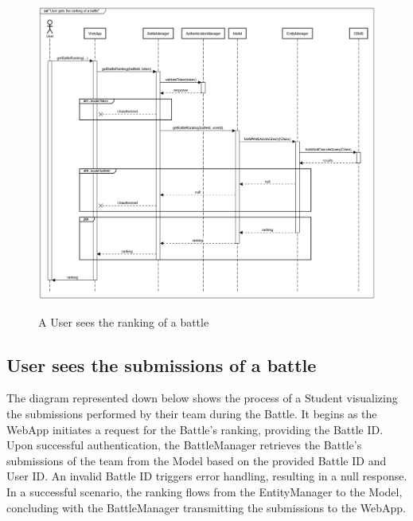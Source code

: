 \documentclass{Configuration_Files/Template}
\begin{document}
\begin{figure}[H]
\centering
\includegraphics[scale = 0.33]{Images/diagrams/sequences/GetBattleRanking.png}\\
\caption{A User sees the ranking of a battle}
\end{figure}

\subsection{User sees the submissions of a battle}

The diagram represented down below shows the process of a Student visualizing the submissions performed by their team during the Battle. It begins as the WebApp initiates a request for the Battle's ranking, providing the Battle ID. Upon successful authentication, the BattleManager retrieves the Battle's submissions of the team from the Model based on the provided Battle ID and User ID. An invalid Battle ID triggers error handling, resulting in a null response. In a successful scenario, the ranking flows from the EntityManager to the Model, concluding with the BattleManager transmitting the submissions to the WebApp.
\end{document}
